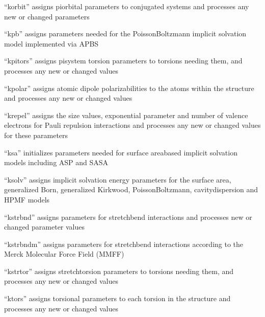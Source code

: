 \documentclass[letterpaper,11pt,english]{sphinxmanual}
\begin{document}
“korbit” assigns pi\sphinxhyphen{}orbital parameters to conjugated systems
and processes any new or changed parameters


“kpb” assigns parameters needed for the Poisson\sphinxhyphen{}Boltzmann
implicit solvation model implemented via APBS


“kpitors” assigns pi\sphinxhyphen{}system torsion parameters to torsions
needing them, and processes any new or changed values


“kpolar” assigns atomic dipole polarizabilities to the atoms
within the structure and processes any new or changed values


“krepel” assigns the size values, exponential parameter and
number of valence electrons for Pauli repulsion interactions
and processes any new or changed values for these parameters


“ksa” initializes parameters needed for surface area\sphinxhyphen{}based
implicit solvation models including ASP and SASA


“ksolv” assigns implicit solvation energy parameters for
the surface area, generalized Born, generalized Kirkwood,
Poisson\sphinxhyphen{}Boltzmann, cavity\sphinxhyphen{}dispersion and HPMF models


“kstrbnd” assigns parameters for stretch\sphinxhyphen{}bend interactions
and processes new or changed parameter values


“kstrbndm” assigns parameters for stretch\sphinxhyphen{}bend interactions
according to the Merck Molecular Force Field (MMFF)


“kstrtor” assigns stretch\sphinxhyphen{}torsion parameters to torsions
needing them, and processes any new or changed values


“ktors” assigns torsional parameters to each torsion in
the structure and processes any new or changed values
\end{document}

